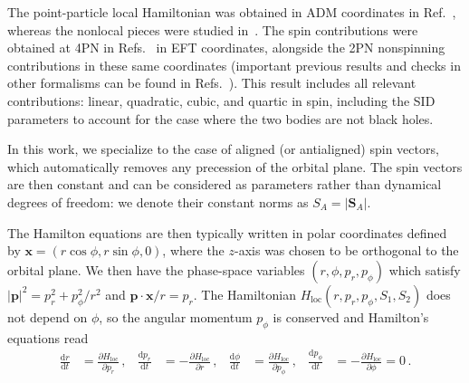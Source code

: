 \documentclass[prd,superscriptaddress,preprintnumbers,tightenlines,nofootinbib, eqsecnum]{revtex4-2}
\renewcommand{\dd}{\mathrm{d}}
\begin{document}
The point-particle local Hamiltonian was obtained in ADM coordinates in Ref.~\cite{Jaranowski:2015lha}, whereas the nonlocal pieces were studied in~\cite{Damour:2014jta,Damour:2015isa}. The spin contributions were obtained at 4PN in Refs.~\cite{Levi:2016ofk,Perrodin:2010dy,Porto:2010tr,Levi:2010zu,Levi:2015uxa,Porto:2006bt,Porto:2008tb,Levi:2008nh,Porto:2008jj,Levi:2011eq,Levi:2015ixa,Levi:2014gsa,Cho:2022syn} in EFT coordinates, alongside the 2PN nonspinning contributions in these same coordinates (important previous results and checks in other formalisms can be found in Refs.~\cite{Damour:2007nc,Hartung:2011te,Hartung:2013dza,Marsat:2012fn,Bohe:2012mr,Steinhoff:2007mb,Steinhoff:2008ji,Hergt:2010pa,Hergt:2011ik,Hartung:2011ea,Hartung:2013dza,Levi:2014sba,Jakobsen:2022fcj,Hergt:2007ha,Hergt:2008jn,Marsat:2014xea,Vaidya:2014kza}). This result includes all relevant contributions: linear, quadratic, cubic, and quartic in spin, including the SID parameters to account for the case where the two bodies are not black holes.


In this work, we specialize to the case of aligned (or antialigned) spin vectors, which automatically removes any precession of the orbital plane. The spin vectors  are then constant and can be considered as parameters rather than dynamical degrees of freedom: we denote their constant norms as $S_A = |\bm{S}_A|$. 

The Hamilton equations are then typically written in polar coordinates defined by $\bm{x}=(r \cos\phi,r\sin\phi,0)$, where the $z$-axis was chosen to be orthogonal to the orbital plane. We then have the phase-space variables $(r,\phi,p_r,p_\phi)$ which satisfy $|\bm{p}|^2=p_r^2+p_\phi^2/r^2$ and $\bm{p} \cdot \bm{x}/r = p_r$. The Hamiltonian $H_\text{loc}(r,p_r,p_\phi,S_1,S_2)$ does not depend on $\phi$, so the angular momentum $p_\phi$ is conserved and  Hamilton's equations read
\begin{align} \label{eq:local_Hamilton_equations_polar}
    \frac{\dd r}{\dd t} &= \frac{\partial H_\text{loc}}{\partial p_r}\,, &
    \frac{\dd p_r}{\dd t} &= -\frac{\partial H_\text{loc}}{\partial r} \,,&
    \frac{\dd \phi}{\dd t} &= \frac{\partial H_\text{loc}}{\partial p_\phi}\,, &
    \frac{\dd p_\phi}{\dd t} &= -\frac{\partial H_\text{loc}}{\partial \phi} =0\,.
\end{align}
\end{document}
